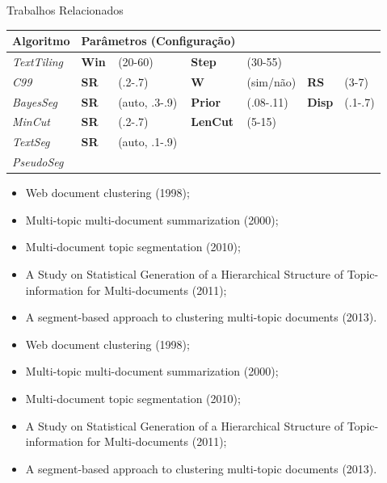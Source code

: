 \begin{frame}{Trabalhos Relacionados}
\begin{table}
\begin{tabular}{l|llllll}
	\textbf{Algoritmo} & \multicolumn{3}{l}{\textbf{Parâmetros} (Configuração)} \\
\hline \hline

\textit{TextTiling} & \textbf{Win} &(20-60)  & \textbf{Step}   &(30-55)                  \\ 
\textit{C99} &        \textbf{SR} &(.2-.7)       & \textbf{W}      &(sim/não) & \textbf{RS}   &(3-7)        \\ 
\textit{BayesSeg} &   \textbf{SR} &(auto, .3-.9) & \textbf{Prior}  &(.08-.11) & \textbf{Disp} &(.1-.7)         \\ 
\textit{MinCut} &     \textbf{SR} &(.2-.7)       & \textbf{LenCut} &(5-15)                             \\ 
\textit{TextSeg} &    \textbf{SR} &(auto, .1-.9) &&&                                      \\ 
\textit{PseudoSeg} &  && &&&      \\ 

\end{tabular}
\end{table}



		\begin{itemize}
			\item Web document clustering (1998); 
			\item Multi-topic multi-document summarization  (2000); 
			\item Multi-document topic segmentation (2010); 
			\item A Study on Statistical Generation of a Hierarchical Structure of Topic-information for Multi-documents (2011); 
			\item A segment-based approach to clustering multi-topic documents (2013).

		\end{itemize} 

		\begin{itemize}
			\item Web document clustering (1998); 
			\item Multi-topic multi-document summarization  (2000); 
			\item Multi-document topic segmentation (2010); 
			\item A Study on Statistical Generation of a Hierarchical Structure of Topic-information for Multi-documents (2011); 
			\item A segment-based approach to clustering multi-topic documents (2013).


\end{itemize}
\end{frame}
